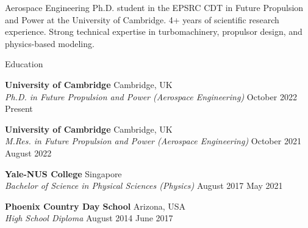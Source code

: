 \documentclass{resume} %
\begin{document}

\begin{center}
    Aerospace Engineering Ph.D. student in the EPSRC CDT in Future Propulsion and Power at the University of Cambridge. 4+ years of scientific research experience. Strong technical expertise in turbomachinery, propulsor design, and physics-based modeling.  
\end{center}





\begin{rSection}{Education}

{\bf \large  University of Cambridge} \hfill {Cambridge, UK}\\
{\em Ph.D. in Future Propulsion and Power (Aerospace Engineering)} \hfill { October 2022 {\textendash}  Present }

{\bf \large  University of Cambridge} \hfill {Cambridge, UK}\\
{\em M.Res. in Future Propulsion and Power (Aerospace Engineering)} \hfill { October 2021 {\textendash}  August 2022 }


{\bf \large  Yale-NUS College} \hfill { Singapore}\\
{\em Bachelor of Science in Physical Sciences (Physics)} \hfill { August 2017 {\textendash}  May 2021 }



{\bf \large  Phoenix Country Day School} \hfill { Arizona, USA}\\
{\em High School Diploma} \hfill { August 2014 {\textendash}  June 2017}




\end{rSection}


\end{document}
